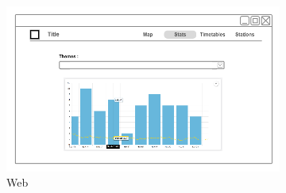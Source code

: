 \begin{figure}[ht]
  \centering
  \begin{subfigure}[b]{0.6\textwidth}
    \includegraphics[width=\textwidth]
      {img/c02-application/png/web-website-stats.png}
    \caption{Web}
  \end{subfigure}
  ~
  \begin{subfigure}[b]{0.2\textwidth}

\end{subfigure}
\end{figure}
